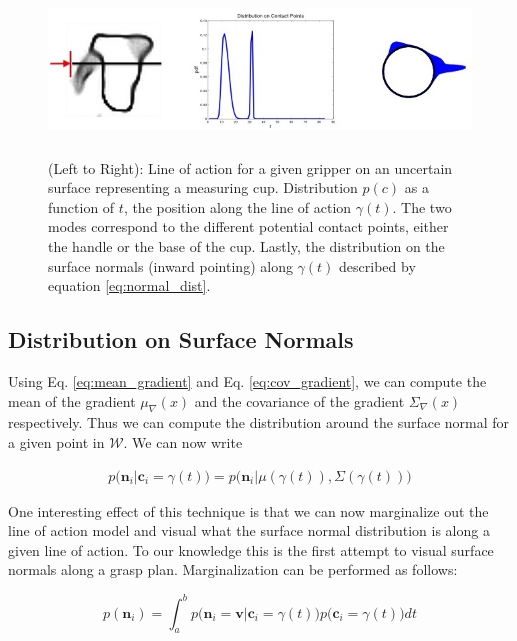 \documentclass[letterpaper, 10 pt, conference]{ieeeconf}  %
\begin{document}
\begin{figure}[ht!]
\centering
\includegraphics[width = 17cm, height = 4.5cm]{figures/Slide04.jpg}
\caption{ \footnotesize (Left to Right): Line of action for a given gripper on an uncertain surface representing a measuring cup. Distribution $p(c)$ as a function of $t$, the position along the line of action $\gamma(t)$. The two modes correspond to the different potential contact points, either the handle or the base of the cup. Lastly, the distribution on the surface normals (inward pointing) along $\gamma(t)$ described by equation \ref{eq:normal_dist}. }
\vspace*{-10pt}
\label{fig:GraspDist}
\end{figure}



\subsection{Distribution on Surface Normals}\label{sec:normals} 
Using Eq. \ref{eq:mean_gradient} and Eq. \ref{eq:cov_gradient}, we can compute the mean of the gradient $ \mu_{\nabla}(x)$ and the covariance of the gradient $\Sigma_{\nabla}(x)$ respectively. Thus we can compute the distribution around the surface normal for a given point in $\mathcal{W}$. We can now write 

\vspace{-2ex}
\begin{align*}
p\big(\textbf{n}_i|\textbf{c}_i = \gamma(t)\big) = p\big(\textbf{n}_i |\mu(\gamma(t)), \Sigma(\gamma(t)) \big)
\end{align*}

One interesting effect of this technique is that we can now marginalize out the line of action model and visual what the surface normal distribution is along a given line of action. To our knowledge this is the first attempt to visual surface normals along a grasp plan. Marginalization can be performed as follows:

\vspace{-2ex}
\begin{equation}
    p(\textbf{n}_i ) = \int_a^b   p\big(\textbf{n}_i = \textbf{v} | \textbf{c}_i = \gamma(t) \big)p\big(\textbf{c}_i = \gamma(t)\big) dt \label{eq:normal_dist}
\end{equation}
\end{document}
